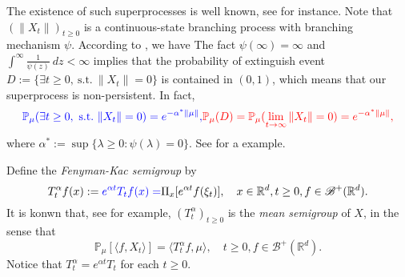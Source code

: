 \documentclass[12pt,oneside,english]{amsart}
\theoremstyle{plain}
\theoremstyle{definition}
\numberwithin{equation}{section}
\newcommand{\added}[1]{{\color{blue}#1}}\newcommand{\deleted}[1]{{\color{red}#1}}
\begin{document}
    The existence of such superprocesses is well known, see \cite{EB} for instance.
    Note that $(\|X_t\|)_{t\geq 0}$ is a continuous-state branching process with branching mechanism $\psi$.
\added{
    According to \cite[Theorem 12.5 \& Theorem 12.7]{Kyprianou2014Fluctuations}, we have
}\deleted{
    The fact $\psi(\infty)=\infty$ and $\int^{\infty}\frac{1}{\psi(z)}~dz<\infty$ implies that the probability of extinguish event $D:= \{\exists t\geq 0,~\text{s.t.}~\|X_t\|=0\}$ is contained in $(0,1)$, which means that our superprocess is non-persistent.
    In fact,
}
\begin{equation}
\added{
    \mathbb{P}_{\mu} (\exists t\geq 0,~\text{s.t.}~\|X_t\|=0)
    = e^{-\alpha^* \|\mu\|},
}\deleted{
    \mathbb{P}_{\mu}(D)
    = \mathbb{P}_{\mu} (\lim_{t \to \infty}\|X_t\|=0 )
    = e^{-\alpha^* \|\mu\|},
}
\end{equation}
    where $\alpha^* := \sup\{\lambda \geq 0: \psi(\lambda) = 0\}$.
\deleted{
    See {\cite[Theorem 12.5 \& Theorem 12.7]{Kyprianou2014Fluctuations} }for a example.
    }

    Define the \emph{Fenyman-Kac semigroup} by
\begin{equation}\label{meansemigroup}
    T^{\alpha}_t f(x)
    :=
\added{ e^{\alpha t} T_t f(x) =}
    \Pi_x [e^{\alpha t}f(\xi_t)],
    \quad x\in \mathbb{R}^d,t\geq 0, f\in \mathscr B^+(\mathbb R^d).
\end{equation}
    It is konwn that, see \cite[Proposition 2.27]{Li2011Measure-valued} for example, $(T^\alpha_t)_{t\geq 0}$ is the \emph{mean semigroup} of $X$, in the sense that
\begin{equation}\label{eq:meanformula}
    \mathbb{P}_{\mu}[\langle f, X_t \rangle]
    = \langle T_t^\alpha f, \mu \rangle,
    \quad t\geq 0, f\in \mathscr B^+(\mathbb R^d).
\end{equation}
\deleted{Notice that $T^{\alpha}_t =e^{\alpha t}T_t$ for each $t \geq 0$.}
\end{document}
